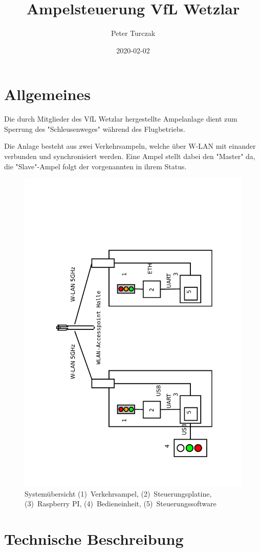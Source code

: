 \documentclass[a4paper, ngerman]{scrartcl}
\begin{document}
\title{Ampelsteuerung VfL Wetzlar}
\author{Peter Turczak}
\date{2020-02-02}

\maketitle
\tableofcontents
\clearpage
\section{Allgemeines}
Die durch Mitglieder des VfL Wetzlar hergestellte Ampelanlage dient zum Sperrung des "Schleusenweges" während des Flugbetriebs.

Die Anlage besteht aus zwei Verkehrsampeln, welche über W-LAN mit einander verbunden und synchronisiert werden. Eine Ampel stellt dabei den "Master" da, die "Slave"-Ampel folgt der vorgenannten in ihrem Status.

\begin{figure}
	\includegraphics[keepaspectratio, width=.7\textwidth, angle=270]{Ampel_Uebersicht.pdf}
	\caption{Systemübersicht (1)~Verkehrsampel, (2)~Steuerungsplatine, (3)~Raspberry PI, (4)~Bedieneinheit, (5)~Steuerungssoftware}
\end{figure}

\section{Technische Beschreibung}
\end{document}
